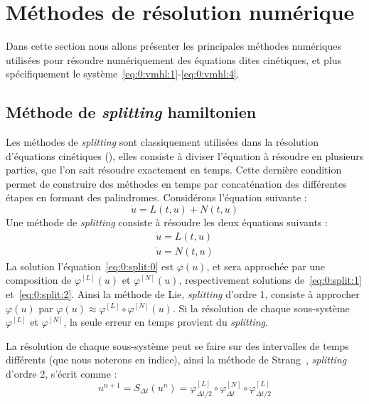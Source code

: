 
\section{Méthodes de résolution numérique}

Dans cette section nous allons présenter les principales méthodes numériques utilisées pour résoudre numériquement des équations dites cinétiques, et plus spécifiquement le système~\eqref{eq:0:vmhl:1}-\eqref{eq:0:vmhl:4}.

\subsection{Méthode de \emph{splitting} hamiltonien}

Les méthodes de \emph{splitting} sont classiquement utilisées dans la résolution d'équations cinétiques (\cite{Morrison:2017,Grandgirard:2006,Tronci:2010,Tronci:2014}), elles consiste à diviser l'équation à résoudre en plusieurs parties, que l'on sait résoudre exactement en temps. Cette dernière condition permet de construire des méthodes en temps par concaténation des différentes étapes en formant des palindromes. Considérons l'équation suivante :
\begin{equation}
  \dot{u} = L(t,u) + N(t,u)
  \label{eq:0:split:0}
\end{equation}
Une méthode de \emph{splitting} consiste à résoudre les deux équations suivants :
\begin{eqnarray}
    \dot{u} = L(t,u) \label{eq:0:split:1}\\
    \dot{u} = N(t,u) \label{eq:0:split:2}
\end{eqnarray}
La solution l'équation~\eqref{eq:0:split:0} est $\varphi(u)$, et sera approchée par une composition de $\varphi^{[L]}(u)$ et $\varphi^{[N]}(u)$, respectivement solutions de~\eqref{eq:0:split:1} et~\eqref{eq:0:split:2}. Ainsi la méthode de Lie, \emph{splitting} d'ordre 1, consiste à approcher $\varphi(u)$ par $\varphi(u)\approx \varphi^{[L]} \circ \varphi^{[N]}(u)$. Si la résolution de chaque sous-système $\varphi^{[L]}$ et $\varphi^{[N]}$, la seule erreur en temps provient du \emph{splitting}.

La résolution de chaque sous-système peut se faire sur des intervalles de temps différents (que nous noterons en indice), ainsi la méthode de Strang~\cite{Strang:1968}, \emph{splitting} d'ordre 2, s'écrit comme :
$$
  u^{n+1} = S_{\Delta t}(u^n) = \varphi^{[L]}_{\Delta t/2}\circ\varphi^{[N]}_{\Delta t}\circ\varphi^{[L]}_{\Delta t/2}
$$

